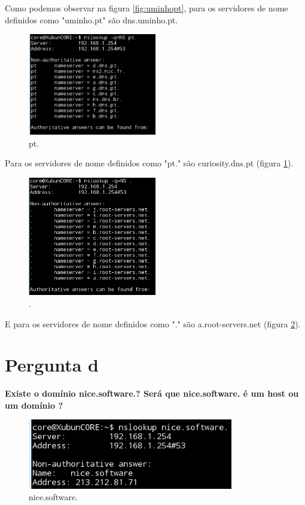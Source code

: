 \documentclass[a4paper]{report}
\begin{document}
Como podemos observar na figura \ref{fig:uminhopt}, para os servidores de nome 
definidos como "uminho.pt" são dns.uminho.pt.

\begin{figure}[H]
    \centering 
    \includegraphics[width=0.5\textwidth]{images/ptponto.png}  
    \caption{pt.}
    \label{fig:ptponto}
\end{figure}

Para os servidores de nome definidos como "pt." são curiosity.dns.pt
(figura \ref{fig:ptponto}).

\begin{figure}[H]
    \centering 
    \includegraphics[width=0.5\textwidth]{images/ponto.png}  
    \caption{.}
    \label{fig:ponto}
\end{figure}

E para os servidores de nome definidos como "." são a.root-servers.net
(figura \ref{fig:ponto}).

\section{Pergunta d}
\textbf{Existe o domínio nice.software.? Será que nice.software. é um host ou um
domínio ?}

\begin{figure}[H]
    \centering 
    \includegraphics[width=0.8\textwidth]{images/nicesoftware.png}  
    \caption{nice.software.}
    \label{fig:nicesoftware}
\end{figure}
\end{document}

